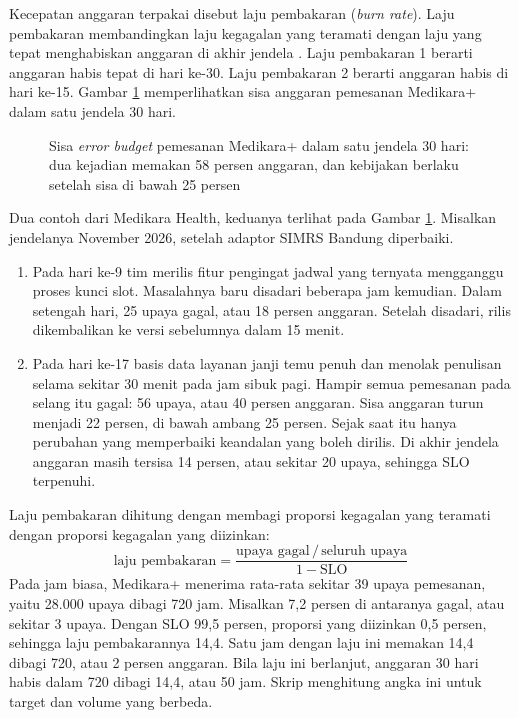 Kecepatan anggaran terpakai disebut laju pembakaran (\textit{burn rate}). Laju pembakaran
membandingkan laju kegagalan yang teramati dengan laju yang tepat menghabiskan anggaran di akhir
jendela \cite{c11-sre-workbook}. Laju pembakaran 1 berarti anggaran habis tepat di hari ke-30.
Laju pembakaran 2 berarti anggaran habis di hari ke-15. Gambar \ref{fig:ch11-sisa-anggaran}
memperlihatkan sisa anggaran pemesanan Medikara+ dalam satu jendela 30 hari.

\begin{figure}[!htb]
  \centering
  
  \caption{Sisa \textit{error budget} pemesanan Medikara+ dalam satu jendela 30 hari: dua
           kejadian memakan 58 persen anggaran, dan kebijakan berlaku setelah sisa di bawah
           25 persen}
  \label{fig:ch11-sisa-anggaran}
\end{figure}

Dua contoh dari Medikara Health, keduanya terlihat pada Gambar \ref{fig:ch11-sisa-anggaran}.
Misalkan jendelanya November 2026, setelah adaptor SIMRS Bandung diperbaiki.
\begin{enumerate}
  \item Pada hari ke-9 tim merilis fitur pengingat jadwal yang ternyata mengganggu proses kunci
        slot. Masalahnya baru disadari beberapa jam kemudian. Dalam setengah hari, 25 upaya gagal,
        atau 18 persen anggaran. Setelah disadari, rilis dikembalikan ke versi sebelumnya dalam 15
        menit.
  \item Pada hari ke-17 basis data layanan janji temu penuh dan menolak penulisan selama sekitar 30
        menit pada jam sibuk pagi. Hampir semua pemesanan pada selang itu gagal: 56 upaya, atau 40
        persen anggaran. Sisa anggaran turun menjadi 22 persen, di bawah ambang 25 persen. Sejak
        saat itu hanya perubahan yang memperbaiki keandalan yang boleh dirilis. Di akhir jendela
        anggaran masih tersisa 14 persen, atau sekitar 20 upaya, sehingga SLO terpenuhi.
\end{enumerate}

\begin{pendalaman}[title={Pendalaman Teknis (opsional): Menghitung Laju Pembakaran}]
  Laju pembakaran dihitung dengan membagi proporsi kegagalan yang teramati dengan proporsi
  kegagalan yang diizinkan:
  \[
    \text{laju pembakaran} = \frac{\text{upaya gagal} \,/\, \text{seluruh upaya}}{1 - \text{SLO}}
  \]
  Pada jam biasa, Medikara+ menerima rata-rata sekitar 39 upaya pemesanan, yaitu 28.000 upaya dibagi
  720 jam. Misalkan 7,2 persen di antaranya gagal, atau sekitar 3 upaya. Dengan SLO 99,5 persen,
  proporsi yang diizinkan 0,5 persen, sehingga laju pembakarannya 14,4. Satu jam dengan laju ini
  memakan 14,4 dibagi 720, atau 2 persen anggaran. Bila laju ini berlanjut, anggaran 30 hari habis
  dalam 720 dibagi 14,4, atau 50 jam. Skrip 
  menghitung angka ini untuk target dan volume yang berbeda.
\end{pendalaman}

